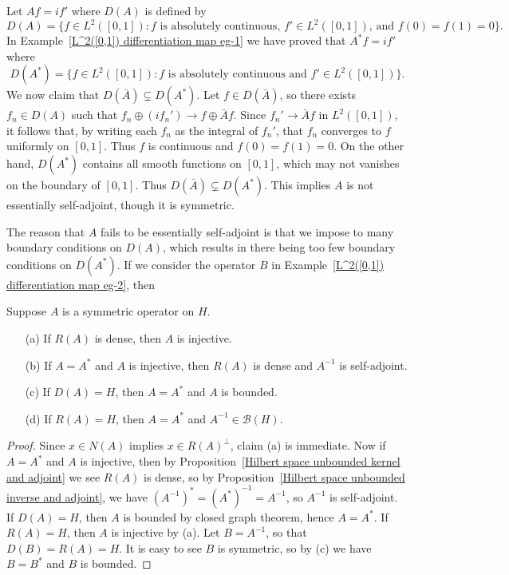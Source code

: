 \begin{example}
Let $Af=if'$ where $D(A)$ is defined by
\[D(A)=\{f\in L^2([0,1]):\text{$f$ is absolutely
continuous, $f'\in L^2([0,1])$, and $f(0)=f(1)=0$}\}.\]
In Example~\ref{L^2([0,1]) differentiation map eg-1} we have proved that $A^*f=if'$ where
\[D(A^*)=\{f\in L^2([0,1]):\text{$f$ is absolutely
continuous and $f'\in L^2([0,1])$}\}.\]
We now claim that $D(\bar{A})\subsetneq D(A^*)$. Let $f\in D(\bar{A})$, so there exists $f_n\in D(A)$ such that $f_n\oplus(if_n')\to f\oplus\bar{A}f$. Since $f_n'\to\bar{A}f$ in $L^2([0,1])$, it follows that, by writing each $f_n$ as the integral of $f_n'$, that $f_n$ converges to $f$ uniformly on $[0,1]$. Thus $f$ is continuous and $f(0)=f(1)=0$. On the other hand, $D(A^*)$ contains all smooth functions on $[0,1]$, which may not vanishes on the boundary of $[0,1]$. Thus $D(\bar{A})\subsetneq D(A^*)$. This implies $A$ is not essentially self-adjoint, though it is symmetric.\par
The reason that $A$ fails to be essentially self-adjoint is that we impose to many boundary conditions on $D(A)$, which results in there being too few boundary conditions on $D(A^*)$. If we consider the operator $B$ in Example~\ref{L^2([0,1]) differentiation map eg-2}, then 
\end{example}
\begin{proposition}\label{Hilbert space symmetric operator prop}
Suppose $A$ is a symmetric operator on $H$.
\begin{itemize}
\item[(a)] If $R(A)$ is dense, then $A$ is injective.
\item[(b)] If $A=A^*$ and $A$ is injective, then $R(A)$ is dense and $A^{-1}$ is self-adjoint.
\item[(c)] If $D(A)=H$, then $A=A^*$ and $A$ is bounded.
\item[(d)] If $R(A)=H$, then $A=A^*$ and $A^{-1}\in\mathcal{B}(H)$.
\end{itemize}
\end{proposition}
\begin{proof}
Since $x\in N(A)$ implies $x\in R(A)^\bot$, claim (a) is immediate. Now if $A=A^*$ and $A$ is injective, then by Proposition~\ref{Hilbert space unbounded kernel and adjoint} we see $R(A)$ is dense, so by Proposition~\ref{Hilbert space unbounded inverse and adjoint}, we have $(A^{-1})^*=(A^*)^{-1}=A^{-1}$, so $A^{-1}$ is self-adjoint.
If $D(A)=H$, then $A$ is bounded by closed graph theorem, hence $A=A^*$. If $R(A)=H$, then $A$ is injective by (a). Let $B=A^{-1}$, so that $D(B)=R(A)=H$. It is easy to see $B$ is symmetric, so by (c) we have $B=B^*$ and $B$ is bounded.
\end{proof}
